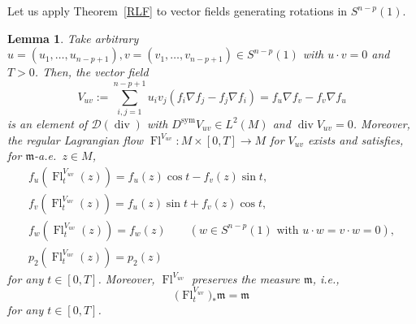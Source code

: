 \documentclass[10pt,a4paper]{amsart}
\numberwithin{equation}{section}
\newtheorem{Lem}[Thm]{Lemma}
\theoremstyle{definition}
\newcommand{\sym}{\operatorname{sym}}
\newcommand{\Fl}{\operatorname{Fl}}
\newcommand{\mf}{\mathfrak{m}}
\newcommand{\Div}{\operatorname{div}}
\newcommand{\D}{\mathcal{D}}
\begin{document}
Let us apply Theorem~\ref{RLF} to vector fields generating rotations in $S^{n-p}(1)$.
\begin{Lem}
Take arbitrary $u=(u_1,\ldots,u_{n-p+1}),v=(v_1,\ldots,v_{n-p+1})\in S^{n-p}(1)$ with $u\cdot v=0$ and $T>0$.
Then, the vector field
\[
V_{u v}:=\sum_{i,j=1}^{n-p+1}u_i v_j(f_i\nabla f_j-f_j\nabla f_i)=f_u\nabla f_v-f_v\nabla f_u
\]
is an element of $\D(\Div)$ with $D^{\sym} V_{u v}\in L^2(M)$ and $\Div V_{u v}=0$.
Moreover, the regular Lag\-ran\-gian flow $\Fl^{V_{u v}}\colon M\times [0,T]\to M$ for $V_{ u v}$ exists and satisfies, for $\mf$-a.e.\ $z\in M$,
\begin{gather*}
f_u(\Fl^{V_{u v}}_t(z))=f_u(z) \cos t- f_v(z)\sin t,
\\
f_v(\Fl^{V_{u v}}_t(z))=f_u(z) \sin t+ f_v(z)\cos t,
\\
f_w(\Fl^{V_{u v}}_t(z))=f_w(z)\qquad (w\in S^{n-p}(1)\text{ with }u\cdot w=v\cdot w=0),
\\
p_2(\Fl^{V_{u v}}_t(z))=p_2(z)
\end{gather*}
for any $t\in[0,T]$.
Moreover,
$\Fl^{V_{u v}}$ preserves the measure $\mf$, i.e.,
\[
\big(\Fl^{V_{u v}}_t\big)_\ast \mf=\mf
\]
for any $t\in[0,T]$.
\end{Lem}
\end{document}

